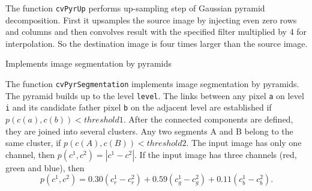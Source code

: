 \begin{description}
\end{description}

The function \texttt{cvPyrUp} performs up-sampling step of Gaussian pyramid decomposition. First it upsamples the source image by injecting even zero rows and columns and then convolves result with the specified filter multiplied by 4 for interpolation. So the destination image is four times larger than the source image.

\label{PyrSegmentation}

Implements image segmentation by pyramids


\begin{description}
\end{description}

The function \texttt{cvPyrSegmentation} implements image segmentation by pyramids. The pyramid builds up to the level \texttt{level}. The links between any pixel \texttt{a} on level \texttt{i} and its candidate father pixel \texttt{b} on the adjacent level are established if
$p(c(a),c(b))<threshold1$.
After the connected components are defined, they are joined into several clusters.
Any two segments A and B belong to the same cluster, if $p(c(A),c(B))<threshold2$.
The input image has only one channel, then $p(c^1,c^2)=|c^1-c^2|$.
If the input image has three channels (red, green and blue), then
\[
  p(c^1,c^2) = 0.30 (c^1_r - c^2_r) +
               0.59 (c^1_g - c^2_g) +
               0.11 (c^1_b - c^2_b).
\]

